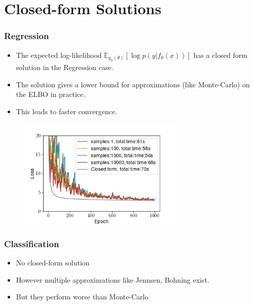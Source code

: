 \documentclass{beamer}
\begin{document}
        \section{Closed-form Solutions}
        \begin{frame}
            \frametitle{Regression}
            \begin{itemize}
                \item The expected log-likelihood $\mathbb{E}_{q_{\phi}(\theta)}[\log{p(y \vert f_{\theta}(x))}]$ has a closed form solution in the Regression case.
                \item The solution gives a lower bound for approximations (like Monte-Carlo) on the ELBO in practice.
                \item This leads to faster convergence.
            \end{itemize}
            \begin{figure}
                \includegraphics[width=0.7\textwidth]{images/Regression/CFvsMC.jpg}
            \end{figure}
        \end{frame}

        \begin{frame}
            \frametitle{Classification}
            \begin{itemize}
                \item No closed-form solution
                \item However multiple approximations like Jennsen, Bohning exist.
                \item But they perform worse than Monte-Carlo
            \end{itemize}
        \end{frame}
        
\end{document}
